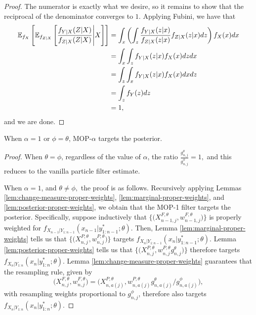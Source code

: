\begin{proof}
    The numerator is exactly what we desire, so it remains to show that the reciprocal of the denominator converges to $1$. Applying Fubini, we have that
    \begin{align*}
        \mathbb{E}_{f_X}\left[\mathbb{E}_{f_{Z|X}}\left[\frac{f_{Y|X}(Z|X)}{f_{Z|X}(Z|X)}\Bigg|X\right]\right] &= \int_x\left(\int_z \frac{f_{Y|X}(z|x)}{f_{Z|X}(z|x)}f_{Z|X}(z|x)dz \right)f_X(x) dx \\
        &= \int_x\int_z f_{Y|X}(z|x) f_X(x) dzdx \\
        &= \int_z\int_x f_{Y|X}(z|x) f_X(x) dxdz \\
        &= \int_z f_{Y}(z) dz \\
        &= 1,
    \end{align*}
    and we are done. 

    
\end{proof}


\begin{prop}
    When $\alpha=1$ or $\phi=\theta$, MOP-$\alpha$ targets the posterior. 
\end{prop}
\begin{proof}
    When $\theta=\phi$, regardless of the value of $\alpha$, the ratio $\frac{g_{n,j}^\theta}{g_{n,j}^\phi}=1,$ and this reduces to the vanilla particle filter estimate.

    When $\alpha=1$, and $\theta\neq\phi,$ the proof is as follows. Recursively applying Lemmas \ref{lem:change-measure-proper-weights}, \ref{lem:marginal-proper-weights}, and \ref{lem:posterior-proper-weights}, we obtain that 
    the MOP-1 filter targets the posterior.
    Specifically, suppose inductively that $\big\{\big(X^{F,\theta}_{n-1,j},w^{F,\theta}_{n-1,j}\big)\big\}$ is properly weighted for $f_{X_{n-1}|Y_{1:n-1}}(x_{n-1}|y^*_{1:n-1};\theta)$.
    Then, Lemma \ref{lem:marginal-proper-weights} tells us that $\big\{\big(X^{P,\theta}_{n,j},w^{P,\theta}_{n,j}\big)\big\}$ targets $f_{X_{n}|Y_{1:n-1}}(x_{n}|y^*_{1:n-1};\theta)$.
    Lemma \ref{lem:posterior-proper-weights} tells us that $\big\{\big(X^{P,\theta}_{n,j},w^{P,\theta}_{n,j} g^\theta_{n,j} \big)\big\}$ therefore targets  $f_{X_{n}|Y_{1:n}}(x_{n}|y^*_{1:n};\theta)$.
    Lemma \ref{lem:change-measure-proper-weights} guarantees that the resampling rule, given by 
    \[
    \big(X^{F,\theta}_{n,j},w^{F,\theta}_{n,j}\big) = \big(X^{P,\theta}_{n,a(j)}, w^{P,\theta}_{n,a(j)} g^\theta_{n,a(j)}\big/ g^\phi_{n,a(j)}\big),
    \]
    with resampling weights proportional to $g^\phi_{n,j}$, therefore also targets $f_{X_{n}|Y_{1:n}}(x_{n}|y^*_{1:n};\theta)$.
\end{proof}

